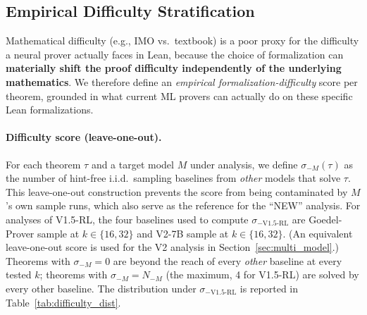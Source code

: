 \documentclass{article}
\begin{document}
\subsection{Empirical Difficulty Stratification}
\label{sec:difficulty}

Mathematical difficulty (e.g., IMO vs.\ textbook) is a poor proxy for the difficulty a neural prover actually faces in Lean, because the choice of formalization can \textbf{materially shift the proof difficulty independently of the underlying mathematics}. We therefore define an \emph{empirical formalization-difficulty} score per theorem, grounded in what current ML provers can actually do on these specific Lean formalizations.

\paragraph{Difficulty score (leave-one-out).}
For each theorem $\tau$ and a target model $M$ under analysis, we define $\sigma_{-M}(\tau)$ as the number of hint-free i.i.d.\ sampling baselines from \emph{other} models that solve $\tau$. This leave-one-out construction prevents the score from being contaminated by $M$'s own sample runs, which also serve as the reference for the ``NEW'' analysis. For analyses of V1.5-RL, the four baselines used to compute $\sigma_{-\text{V1.5-RL}}$ are Goedel-Prover sample at $k{\in}\{16,32\}$ and V2-7B sample at $k{\in}\{16,32\}$. (An equivalent leave-one-out score is used for the V2 analysis in Section~\ref{sec:multi_model}.) Theorems with $\sigma_{-M}{=}0$ are beyond the reach of every \emph{other} baseline at every tested $k$; theorems with $\sigma_{-M}{=}N_{-M}$ (the maximum, 4 for V1.5-RL) are solved by every other baseline. The distribution under $\sigma_{-\text{V1.5-RL}}$ is reported in Table~\ref{tab:difficulty_dist}.
\end{document}
